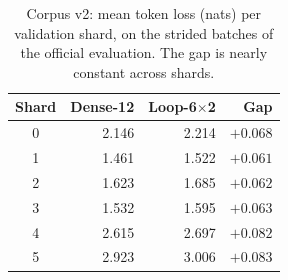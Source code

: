 \begin{table}[t]
\centering
\caption{Corpus v2: mean token loss (nats) per validation shard, on the strided batches of the official evaluation. The gap is nearly constant across shards.}
\label{tab:shards}
\begin{tabular}{crrr}
\toprule
Shard & Dense-12 & Loop-6$\times$2 & Gap \\
\midrule
0 & 2.146 & 2.214 & $+0.068$ \\
1 & 1.461 & 1.522 & $+0.061$ \\
2 & 1.623 & 1.685 & $+0.062$ \\
3 & 1.532 & 1.595 & $+0.063$ \\
4 & 2.615 & 2.697 & $+0.082$ \\
5 & 2.923 & 3.006 & $+0.083$ \\
\bottomrule
\end{tabular}
\end{table}
